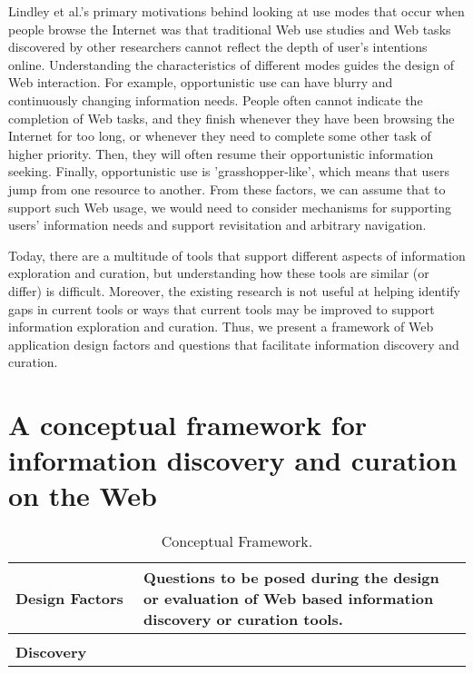 \documentclass{casconpaper}
\begin{document}
{{{Lindley et al.'s primary motivations behind looking at use modes that occur when people browse the Internet was that traditional Web use studies and Web tasks discovered by other researchers cannot reflect the depth of user's intentions online. Understanding the characteristics of different modes guides the design of Web interaction. For example, opportunistic use can have blurry and continuously changing information needs. People often cannot indicate the completion of Web tasks, and they finish whenever they have been browsing the Internet for too long, or whenever they need to complete some other task of higher priority. Then, they will often resume their opportunistic information seeking. Finally, opportunistic use is 'grasshopper-like', which means that users jump from one resource to another. From these factors, we can assume that to support such Web usage, we would need to consider mechanisms for supporting users' information needs and support revisitation and arbitrary navigation.

} %

Today, there are a multitude of tools that support different aspects of information exploration and curation, but understanding how these tools are similar (or differ) is difficult. Moreover, the existing research is not useful at helping identify gaps in current tools or ways that current tools may be improved to support information
exploration and curation. Thus, we present a framework of Web application design factors and questions that facilitate information discovery and curation.
} %




{\section{A conceptual framework for information discovery and curation on the Web}
\begin{table*}[htbp]
\caption{Conceptual Framework.}
\centering
\small
\begin{tabular}{|p{0.28\linewidth}|p{0.72\linewidth}|}
\hline
\textbf{\large{Design Factors}}   & \textbf{\large{Questions to be posed during the design or evaluation of Web based information discovery or curation tools. 
}}  \\
\hline
&\\
\textbf{\large{Discovery}}                     &                                                                                                           \\


\end{tabular}
\end{table*}}}
\end{document}
